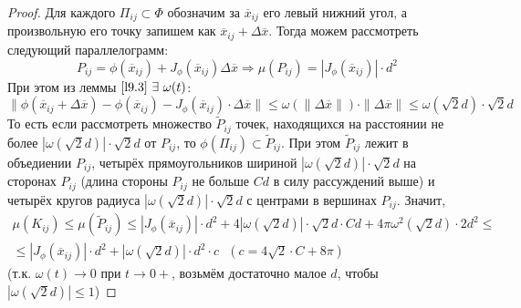 \begin{proof}
    Для каждого $\Pi_{ij} \subset \Phi$ обозначим за $\overline{x}_{ij}$ его левый нижний угол, а произвольную его точку запишем как $\overline{x}_{ij} + \Delta\overline{x}$. Тогда можем рассмотреть следующий параллелограмм:
    \[P_{ij} = \phi(\overline{x}_{ij}) + J_\phi(\overline{x}_{ij}) \Delta\overline{x}\Longrightarrow \mu(P_{ij}) = |J_\phi(\overline{x}_{ij})|\cdot d^2\]
    При этом из леммы $\ref{l9.3} \ \exists\ \omega(t)$:
    \[\|\phi(\overline{x}_{ij}+\Delta\overline{x})-\phi(\overline{x}_{ij})-J_\phi(\overline{x}_{ij})\cdot \Delta\overline{x}\| \leqslant \omega(\|\Delta\overline{x}\|)\cdot \|\Delta\overline{x}\| \leqslant \omega(\sqrt{2}d)\cdot \sqrt{2}d\]
    То есть если рассмотреть множество $\tilde{P}_{ij}$ точек, находящихся на расстоянии не более $|\omega(\sqrt{2}d)|\cdot \sqrt{2}d$ от $P_{ij}$, то $\phi(\Pi_{ij}) \subset \tilde{P}_{ij}$. При этом $\tilde{P}_{ij}$ лежит в объедиении $P_{ij}$, четырёх прямоугольников шириной $|\omega(\sqrt{2}d)|\cdot \sqrt{2}d$ на сторонах $P_{ij}$ (длина стороны $P_{ij}$ не больше $Cd$ в силу рассуждений выше) и четырёх кругов радиуса $|\omega(\sqrt{2}d)|\cdot \sqrt{2}d$ с центрами в вершинах $P_{ij}$. Значит,
    \begin{multline*}
        \mu(K_{ij}) \leqslant \mu(\tilde{P}_{ij}) \leqslant |J_\phi(\overline{x}_{ij})|\cdot d^2 + 4 |\omega(\sqrt{2}d)|\cdot \sqrt{2}d\cdot Cd + 4\pi\omega^2(\sqrt{2}d)\cdot 2d^2 \leqslant \\ \leqslant |J_\phi(\overline{x}_{ij})|\cdot d^2 + |\omega(\sqrt{2}d)| \cdot d^2\cdot  c \ \ \ (c = 4\sqrt{2}\cdot C + 8\pi)
    \end{multline*}
    (т.к. $\omega(t) \rightarrow 0$ при $t\rightarrow 0+$, возьмём достаточно малое $d$, чтобы $|\omega(\sqrt{2}d)| \leqslant 1$)


\end{proof}

